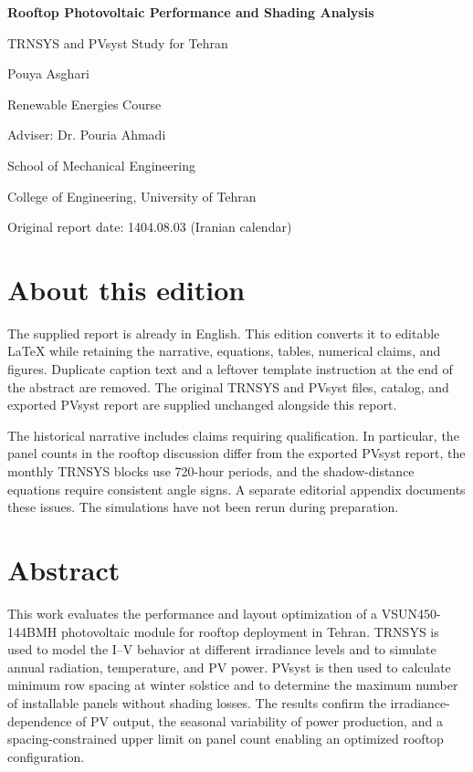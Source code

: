 \documentclass[11pt,a4paper]{article}
\begin{document}
\begin{titlepage}\centering\vspace*{25mm}
{\huge\bfseries Rooftop Photovoltaic Performance and Shading Analysis\par}\vspace{8mm}
{\Large TRNSYS and PVsyst Study for Tehran\par}\vspace{7mm}{\large Homework One\par}\vspace{20mm}
{\Large Pouya Asghari\par}\vspace{10mm}Renewable Energies Course\par Adviser: Dr. Pouria Ahmadi\par
\vfill School of Mechanical Engineering\par College of Engineering, University of Tehran\par
Original report date: 1404.08.03 (Iranian calendar)\par
\end{titlepage}
\section*{About this edition}
The supplied report is already in English. This edition converts it to editable LaTeX while retaining the narrative, equations, tables, numerical claims, and figures. Duplicate caption text and a leftover template instruction at the end of the abstract are removed. The original TRNSYS and PVsyst files, catalog, and exported PVsyst report are supplied unchanged alongside this report.

The historical narrative includes claims requiring qualification. In particular, the panel counts in the rooftop discussion differ from the exported PVsyst report, the monthly TRNSYS blocks use 720-hour periods, and the shadow-distance equations require consistent angle signs. A separate editorial appendix documents these issues. The simulations have not been rerun during preparation.
\begingroup\small\setlength{\parskip}{0pt}\tableofcontents\endgroup\clearpage


\FloatBarrier
\section{Abstract}

This work evaluates the performance and layout optimization of a VSUN450-144BMH photovoltaic module for rooftop deployment in Tehran. TRNSYS is used to model the I--V behavior at different irradiance levels and to simulate annual radiation, temperature, and PV power. PVsyst is then used to calculate minimum row spacing at winter solstice and to determine the maximum number of installable panels without shading losses. The results confirm the irradiance-dependence of PV output, the seasonal variability of power production, and a spacing-constrained upper limit on panel count enabling an optimized rooftop configuration.
\end{document}
